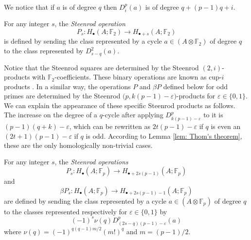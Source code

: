 We notice that if $a$ is of degree $q$ then $D^p_i(a)$ is of degree $q + (p-1)q + i$.

\begin{definition}
	For any integer $s$, the \textit{Steenrod operation}
	\begin{equation*}
	P_s \colon H_\bullet(A; \mathbb{F}_2) \to H_{\bullet + s}(A; \mathbb{F}_2)
	\end{equation*}
	is defined by sending the class represented by a cycle $a \in (A \otimes \mathbb{F}_2)$ of degree $q$ to the class represented by $D^2_{s-q}(a)$.
\end{definition}

Notice that the Steenrod squares are determined by the Steenrod $(2,i)$-products with $\mathbb{F}_2$-coefficients.
These binary operations are known as cup-$i$ products \cite{steenrod1947products, medina2021newformulas}.
In a similar way, the operations $P$ and $\beta P$ defined below for odd primes are determined by the Steenrod $\big(p, k(p-1)-\varepsilon\big)$-products for $\varepsilon \in \{0,1\}$.
We can explain the appearance of these specific Steenrod products as follows.
The increase on the degree of a $q$-cycle after applying $D^p_{k(p-1)-\varepsilon}$ to it is $(p-1)(q+k) - \varepsilon$, which can be rewritten as $2t(p-1) - \varepsilon$ if $q$ is even an $(2t+1)(p-1) - \varepsilon$ if $q$ is odd.
According to Lemma \ref{lem: Thom's theorem}, these are the only homologically non-trivial cases.

\begin{definition} \label{def: Steenrod operations at odd prime}
	For any integer $s$, the \textit{Steenrod operations}
	\begin{equation*}
	P_s \colon H_\bullet(A; \mathbb{F}_p) \to H_{\bullet + 2s(p-1)}(A; \mathbb{F}_p)
	\end{equation*}
	and
	\begin{equation*}
	\beta P_s \colon H_\bullet(A; \mathbb{F}_p) \to H_{\bullet + 2s(p-1) - 1}(A; \mathbb{F}_p)
	\end{equation*}
	are defined by sending the class represented by a cycle $a \in (A \otimes \mathbb{F}_p)$ of degree $q$ to the classes represented respectively for $\varepsilon \in\{0,1\}$ by
	\begin{equation*}
	(-1)^s \nu(q) D^p_{(2s-q)(p-1)-\varepsilon}(a)
	\end{equation*}
	where $\nu(q) = (-1)^{q(q-1)m/2}(m!)^q$ and $m = (p-1)/2$.
\end{definition}

